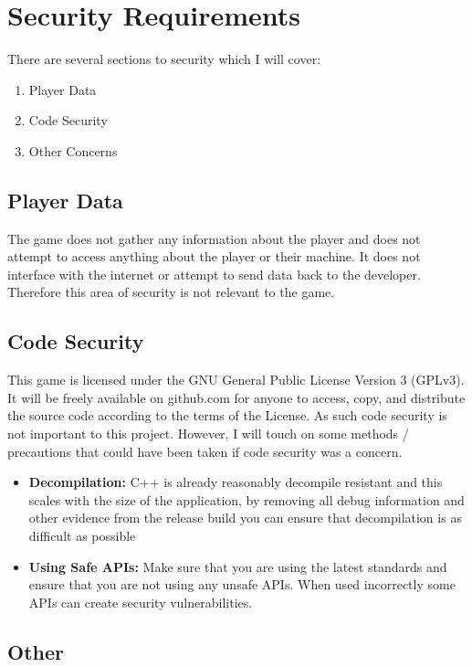 \documentclass{article}
\begin{document}
\section{Security Requirements}

There are several sections to security which I will cover:
\begin{enumerate}
    \item Player Data
    \item Code Security
    \item Other Concerns
\end{enumerate}

\subsection{Player Data}

The game does not gather any information about the player and does not attempt to access anything about the player or their machine.
It does not interface with the internet or attempt to send data back to the developer.
Therefore this area of security is not relevant to the game.

\subsection{Code Security}

This game is licensed under the GNU General Public License Version 3 (GPLv3).
It will be freely available on github.com for anyone to access, copy, and distribute the source code according to the terms of the License.
As such code security is not important to this project.
However, I will touch on some methods / precautions that could have been taken if code security was a concern.

\begin{itemize}
    \item \textbf{Decompilation:} C++ is already reasonably decompile resistant and this scales with the size of the application,
    by removing all debug information and other evidence from the release build you can ensure that decompilation is as difficult as possible
    \item \textbf{Using Safe APIs:} Make sure that you are using the latest standards and ensure that you are not using any unsafe APIs.
    When used incorrectly some APIs can create security vulnerabilities.
\end{itemize}

\subsection{Other}
\end{document}
